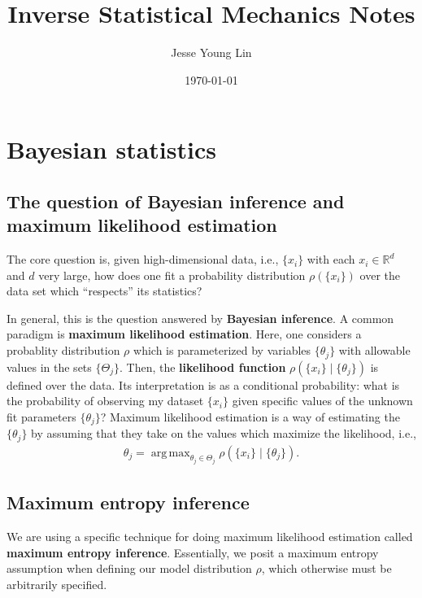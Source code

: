 \documentclass[11pt]{article}
\author{Jesse Young Lin}
\date{\today}
\title{Inverse Statistical Mechanics Notes}
\DeclareMathOperator*{\argmax}{arg\,max}
\begin{document}
\maketitle
\tableofcontents

\section{Bayesian statistics}
\label{sec:orgc31e2eb}
\subsection{The question of Bayesian inference and maximum likelihood estimation}
\label{sec:orgbc8ce79}
The core question is, given high-dimensional data, i.e., \(\{x_{i}\}\) with each
\(x_{i} \in \mathbb{R}^{d}\) and \(d\) very large, how does one fit a
probability distribution \(\rho(\{x_{i}\})\) over the data set which ``respects''
its statistics?

In general, this is the question answered by \textbf{Bayesian inference}. A common
paradigm is \textbf{maximum likelihood estimation}. Here, one considers a probablity
distribution \(\rho\) which is parameterized by variables \(\{\theta_{j}\}\)
with allowable values in the sets \(\{\Theta_{j}\}\).
Then, the \textbf{likelihood function} \(\rho( \{x_{i}\} \mid \{\theta_{j}\})\) is
defined over the data. Its interpretation is as a conditional probability: what
is the probability of observing my dataset \(\{x_{i}\}\) given specific values
of the unknown fit parameters \(\{\theta_{j}\}\)? Maximum likelihood estimation
is a way of estimating the \(\{\theta_{j}\}\) by assuming that they take on the
values which maximize the likelihood, i.e.,
\begin{align*}
\theta_{j} = \argmax_{\theta_{j} \in \Theta_{j}} \rho(\{x_{i}\} \mid \{\theta_{j}\}).
\end{align*}
\subsection{Maximum entropy inference}
\label{sec:org282131b}
We are using a specific technique for doing maximum likelihood estimation called
\textbf{maximum entropy inference}. Essentially, we posit a maximum entropy assumption
when defining our model distribution \(\rho\), which otherwise must be
arbitrarily specified.
\end{document}
